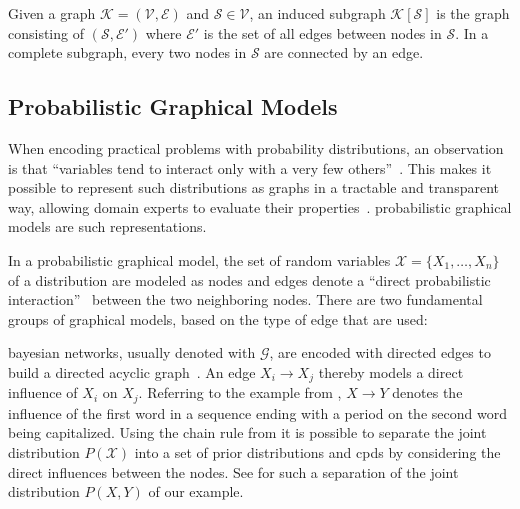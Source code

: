 Given a \gls{graph} $\mathcal{K} = (\mathcal{V},\mathcal{E})$ and $\mathcal{S}\in\mathcal{V}$, an induced \gls{subgraph} $\mathcal{K}[\mathcal{S}]$ is the \gls{graph} consisting of $(\mathcal{S},\mathcal{E'})$ where $\mathcal{E'}$ is the set of all \glspl{edge} between \glspl{node} in $\mathcal{S}$.
In a complete \gls{subgraph}, every two \glspl{node} in $\mathcal{S}$ are connected by an \gls{edge}.

\subsection{Probabilistic Graphical Models}\label{subsec:graphical-models}
When encoding practical problems with \glspl{probability distribution}, an observation is that ``variables tend to interact only with a very few others''~\citep{koller2009probabilistic}.
This makes it possible to represent such distributions as graphs in a tractable and transparent way, allowing domain experts to evaluate their properties~\citep{koller2009probabilistic}.
\Glspl{probabilistic graphical model} are such representations.

\bigskip

In a \gls{probabilistic graphical model}, the set of \glspl{random variable} $\mathcal{X}=\{X_1,\dots,X_n\}$ of a distribution are modeled as \glspl{node} and \glspl{edge} denote a ``direct probabilistic interaction''~\citep{koller2009probabilistic} between the two neighboring nodes.
There are two fundamental groups of graphical models, based on the type of edge that are used:

\Glspl{bayesian network}, usually denoted with $\mathcal{G}$, are encoded with directed \glspl{edge} to build a directed acyclic graph~\citep{koller2009probabilistic}.
An \gls{edge} $X_i\to X_j$ thereby models a direct influence of $X_i$ on $X_j$.
Referring to the example from , $X\to Y$ denotes the influence of the first word in a sequence ending with a period on the second word being capitalized.
Using the chain rule from  it is possible to separate the \gls{joint distribution} $P(\mathcal{X})$ into a set of \glspl{prior distribution} and \glspl{cpd} by considering the direct influences between the \glspl{node}.
See  for such a separation of the \gls{joint distribution} $P(X,Y)$ of our example.

